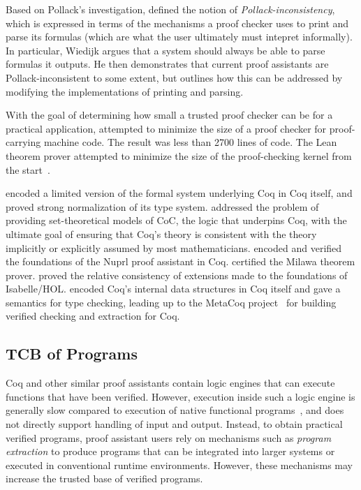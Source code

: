 Based on Pollack's investigation, \cite{Wiedijk2012} defined the notion of \emph{Pollack-inconsistency}, which is expressed in terms of the mechanisms a proof checker uses to print and parse its formulas (which are what the user ultimately must intepret informally). In particular, Wiedijk argues that a system should always be able to parse formulas it outputs. He then demonstrates that current proof assistants are Pollack-inconsistent to some extent, but outlines how this can be addressed by modifying the implementations of printing and parsing.

With the goal of determining how small a trusted proof checker can be for a practical application,
\cite{Appel2003} attempted to minimize the size of a proof checker for proof-carrying machine code.
The result was less than 2700 lines of code.
The Lean theorem prover attempted to minimize the size of the proof-checking kernel from the start~\citep{deMoura2015}.

\cite{coqincoq} encoded a limited version of the formal system underlying Coq in Coq itself, and proved strong normalization of its type system. \cite{Barras2010} addressed the problem of providing set-theoretical models of CoC, the logic that underpins Coq, with the ultimate goal of ensuring that Coq's theory is consistent with the theory implicitly or explicitly assumed by most mathematicians. \cite{Anand2014} encoded and verified the foundations of the Nuprl proof assistant in Coq. \cite{Davis2015} certified the Milawa theorem prover. \cite{Kuncar2018} proved the relative consistency of extensions made to the foundations of Isabelle/HOL. 
\cite{Anand2018} encoded Coq's internal data structures in Coq itself and gave a semantics for type checking, leading up to the MetaCoq project~\citep{Sozeau2019} for building verified checking and extraction for Coq.

\subsection{TCB of Programs}
\label{sec:trust-programs}

Coq and other similar proof assistants contain logic engines that can execute functions that have been verified. However, execution inside such a logic engine is generally slow compared to execution of native functional programs~\citep{Leroy2015}, and does not directly support handling of input and output. Instead, to obtain practical verified programs, proof assistant users rely on mechanisms such as \emph{program extraction} to produce programs that can be integrated into larger systems or executed in conventional runtime environments. However, these mechanisms may increase the trusted base of verified programs.

